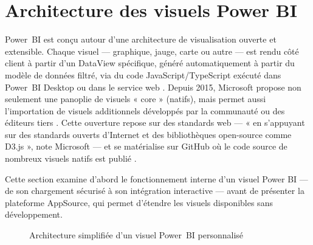 \section{Architecture des visuels Power BI}
\label{sec:archi-powerbi}

Power~BI est conçu autour d’une architecture de visualisation ouverte et extensible.  
Chaque visuel — graphique, jauge, carte ou autre — est rendu côté client à partir d’un DataView spécifique, généré automatiquement à partir du modèle de données filtré, via du code JavaScript/TypeScript exécuté dans Power~BI Desktop ou dans le service web \parencite{MicrosoftOpenVis2015}.  
Depuis 2015, Microsoft propose non seulement une panoplie de visuels « core » (natifs), mais permet aussi l’importation de visuels additionnels développés par la communauté ou des éditeurs tiers \parencite{MicrosoftMarketplace2016}.  
Cette ouverture repose sur des standards web — « en s’appuyant sur des standards ouverts d’Internet et des bibliothèques open-source comme D3.js », note Microsoft \parencite{MicrosoftD3Blog2017} — et se matérialise sur GitHub où le code source de nombreux visuels natifs est publié \parencite{GitHubPowerBISamples2024}.  


Cette section examine d’abord le fonctionnement interne d’un visuel Power BI — de son chargement sécurisé à son intégration interactive — avant de présenter la plateforme AppSource, qui permet d’étendre les visuels disponibles sans développement.

\begin{figure}[h]
  \centering
  \caption{Architecture simplifiée d’un visuel Power~BI personnalisé}
  \label{fig:archi-visuel}
\end{figure}


